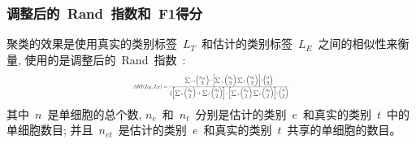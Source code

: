 \subsubsection{调整后的~Rand~指数和~F1得分}
聚类的效果是使用真实的类别标签~$L_T$~和估计的类别标签~$L_E$~之间的相似性来衡量,
使用的是调整后的~Rand~指数~\cite{hubert1985comparing,wu2005dynamic}:
\begin{equation}
\label{eq:ARI}
\resizebox{0.4\textwidth}{!}{$
    ARI(L_E,L_T)=\frac{\sum_{}{}_{e,t} \begin{pmatrix}n_{et}\\ 2\end{pmatrix} - \begin{bmatrix}  \sum_{}{}_{e} \begin{pmatrix}n_{e}\\ 2\end{pmatrix}\sum_{}{}_{t} \begin{pmatrix}n_{t}\\ 2\end{pmatrix}  \end{bmatrix} / \begin{pmatrix}n\\ 2\end{pmatrix} 
    }{\frac{1}{2}\begin{bmatrix}
    \sum{}{}_e\begin{pmatrix}n_{e}\\ 2\end{pmatrix} + \sum{}{}_t\begin{pmatrix}n_{t}\\ 2\end{pmatrix}
    \end{bmatrix} - \begin{bmatrix}
    \sum{}{}_e\begin{pmatrix}n_{e}\\ 2\end{pmatrix} \sum{}{}_t\begin{pmatrix}n_{t}\\ 2\end{pmatrix} 
    \end{bmatrix}/\begin{pmatrix}n\\ 2\end{pmatrix}}    
$}
\end{equation}
其中~$n$~是单细胞的总个数, 
$n_e$~和~$n_t$~分别是估计的类别~$e$~和真实的类别~$t$~中的单细胞数目; 
并且~$n_{et}$~是估计的类别~$e$~和真实的类别~$t$~共享的单细胞的数目。

